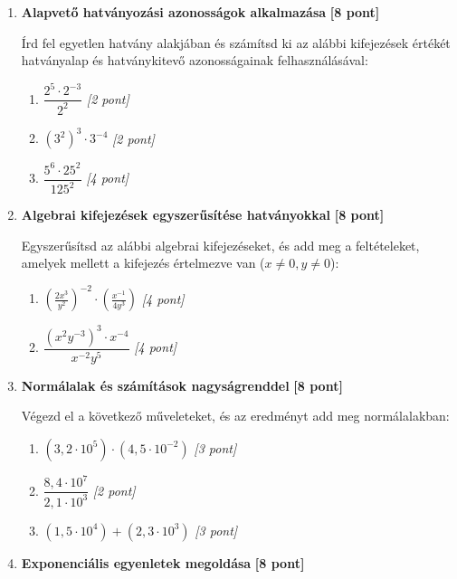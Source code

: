 \documentclass[11pt,a4paper]{article}
\begin{document}
\begin{enumerate}
    \item \textbf{Alapvető hatványozási azonosságok alkalmazása} \hfill \textbf{[8 pont]}
    
    Írd fel egyetlen hatvány alakjában és számítsd ki az alábbi kifejezések értékét hatványalap és hatványkitevő azonosságainak felhasználásával:
    \begin{enumerate}
        \item $\dfrac{2^5 \cdot 2^{-3}}{2^2}$ \hfill \textit{[2 pont]}
        \item $(3^2)^3 \cdot 3^{-4}$ \hfill \textit{[2 pont]}
        \item $\dfrac{5^6 \cdot 25^2}{125^2}$ \hfill \textit{[4 pont]}
    \end{enumerate}

    \vspace{2mm}
    \item \textbf{Algebrai kifejezések egyszerűsítése hatványokkal} \hfill \textbf{[8 pont]}
    
    Egyszerűsítsd az alábbi algebrai kifejezéseket, és add meg a feltételeket, amelyek mellett a kifejezés értelmezve van ($x \neq 0, y \neq 0$):
    \begin{enumerate}
        \item $\left(\frac{2x^3}{y^2}\right)^{-2} \cdot \left(\frac{x^{-1}}{4y^3}\right)$ \hfill \textit{[4 pont]}
        \item $\dfrac{(x^2 y^{-3})^3 \cdot x^{-4}}{x^{-2} y^5}$ \hfill \textit{[4 pont]}
    \end{enumerate}

    \vspace{2mm}
    \item \textbf{Normálalak és számítások nagyságrenddel} \hfill \textbf{[8 pont]}
    
    Végezd el a következő műveleteket, és az eredményt add meg normálalakban:
    \begin{enumerate}
        \item $(3,2 \cdot 10^5) \cdot (4,5 \cdot 10^{-2})$ \hfill \textit{[3 pont]}
        \item $\dfrac{8,4 \cdot 10^7}{2,1 \cdot 10^3}$ \hfill \textit{[2 pont]}
        \item $(1,5 \cdot 10^4) + (2,3 \cdot 10^3)$ \hfill \textit{[3 pont]}
    \end{enumerate}

    \vspace{2mm}
    \item \textbf{Exponenciális egyenletek megoldása} \hfill \textbf{[8 pont]}
    

\end{enumerate}
\end{document}
